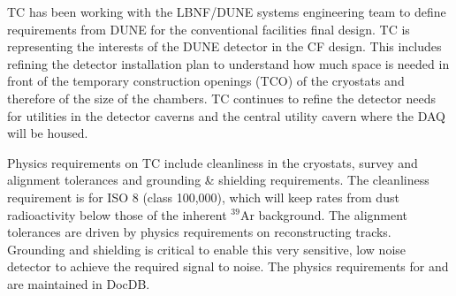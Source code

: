 TC has been working with the LBNF/DUNE systems engineering team to
define requirements from DUNE for the conventional facilities final
design. TC is representing the interests of the DUNE detector in the
CF design. This includes refining the detector installation plan to
understand how much space is needed in front of the temporary
construction openings (TCO) of the cryostats and therefore of the size
of the chambers. TC continues to refine the detector needs for
utilities in the detector caverns and the central utility cavern where
the DAQ will be housed.

Physics requirements on TC include cleanliness in the cryostats,
survey and alignment tolerances and grounding \& shielding
requirements. The cleanliness requirement is for ISO 8 (class
100,000), which will keep rates from dust radioactivity below those of
the inherent $^{39}$Ar background. The alignment tolerances are driven
by physics requirements on reconstructing tracks. Grounding and
shielding is critical to enable this very sensitive, low noise
detector to achieve the required signal to noise. The physics
requirements for  and  are maintained in
DocDB.







